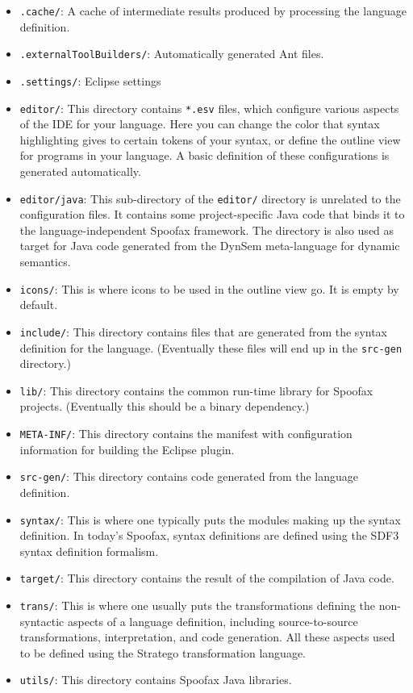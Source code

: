 \begin{itemize}

  \item \texttt{.cache/}: A cache of intermediate results produced by processing
  the language definition.
  \item \texttt{.externalToolBuilders/}: Automatically generated Ant files.
  \item \texttt{.settings/}: Eclipse settings
  \item \texttt{editor/}: This directory contains \texttt{*.esv} files, which
  configure various aspects of the IDE for your language. Here you can change
  the color that syntax highlighting gives to certain tokens of your syntax, or
  define the outline view for programs in your language. A basic definition of
  these configurations is generated automatically. 
  \item \texttt{editor/java}: This sub-directory of the \texttt{editor/}
  directory is unrelated to the configuration files. It contains some
  project-specific Java code that binds it to the language-independent Spoofax
  framework. The directory is also used as target for Java code generated from
  the DynSem meta-language for dynamic semantics.
  \item \texttt{icons/}: This is where icons to be used in the outline view go.
  It is empty by default.
  \item \texttt{include/}: This directory contains files that are generated from
  the syntax definition for the language. (Eventually these files will end up
  in the \texttt{src-gen} directory.)
  \item \texttt{lib/}: This directory contains the common run-time library for
  Spoofax projects. (Eventually this should be a binary dependency.)
  \item \texttt{META-INF/}: This directory contains the manifest with
  configuration information for building the Eclipse plugin.
  \item \texttt{src-gen/}: This directory contains code generated from the
  language definition.
  \item \texttt{syntax/}: This is where one typically puts the modules making up
  the syntax definition. In today's Spoofax, syntax definitions are defined
  using the SDF3 syntax definition formalism.
  \item \texttt{target/}: This directory contains the result of the compilation
  of Java code.
  \item \texttt{trans/}: This is where one usually puts the transformations
  defining the non-syntactic aspects of a language definition, including
  source-to-source transformations, interpretation, and code generation. All
  these aspects used to be defined using the Stratego transformation language.
  \item \texttt{utils/}: This directory contains Spoofax Java libraries.
\end{itemize}

